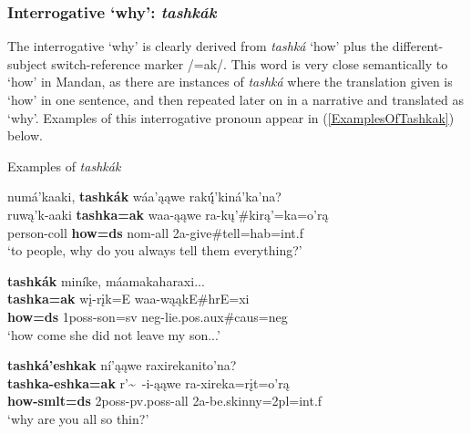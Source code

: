 \subsubsection{Interrogative `why': \textit{tashkák}}\label{SubSubSecTashkak}

The interrogative `why' is clearly derived from \textit{tashká} `how' plus the different-subject switch-reference marker /=ak/. This word is very close semantically to `how' in Mandan, as there are instances of \textit{tashká} where the translation given is `how' in one sentence, and then repeated later on in a narrative and translated as `why'. Examples of this interrogative pronoun appear in (\ref{ExamplesOfTashkak}) below.

\begin{exe}

\item\label{ExamplesOfTashkak} Examples of \textit{tashkák}

    \begin{xlist}
    
    \item\label{ExamplesOfTashkak1} \glll numá'kaaki, \textbf{tashkák} wáa'ąąwe rakų́́'kiná'ka'na?\\
    ruwą'k-aaki \textbf{tashka=ak} waa-ąąwe ra-kų'\#kirą'=ka=o'rą\\
    \textnormal{person}-coll \textbf{\textnormal{\bfseries how}=ds} nom-\textnormal{all} 2a-\textnormal{give}\#\textnormal{tell}=hab=int.f\\
    \glt `to people, why do you always tell them everything?' \citep[213]{hollow1973a}
    
    \item\label{ExamplesOfTashkak2} \glll \textbf{tashkák} miníke, máamakaharaxi...\\
    \textbf{tashka=ak} wį-rįk=E waa-wąąkE\#hrE=xi\\
    \textbf{\textnormal{\bfseries how}=ds} 1poss-\textnormal{son}=sv neg-\textnormal{lie}.pos.aux\#caus=neg\\
    \glt `how come she did not leave my son...' \citep[82]{hollow1973a} 
    
    \item\label{ExamplesOfTashkak3} \glll \textbf{tashká'eshkak} ní'ąąwe raxirekanito'na?\\
    \textbf{tashka-eshka=ak} r'\~~-i-ąąwe ra-xireka=rįt=o'rą\\
    \textbf{\textnormal{\bfseries how}-smlt=ds} 2poss-pv.poss-\textnormal{all} 2a-\textnormal{be.skinny}=2pl=int.f\\
    \glt `why are you all so thin?' \citep[138]{hollow1973b}
    

\end{xlist}
\end{exe}
